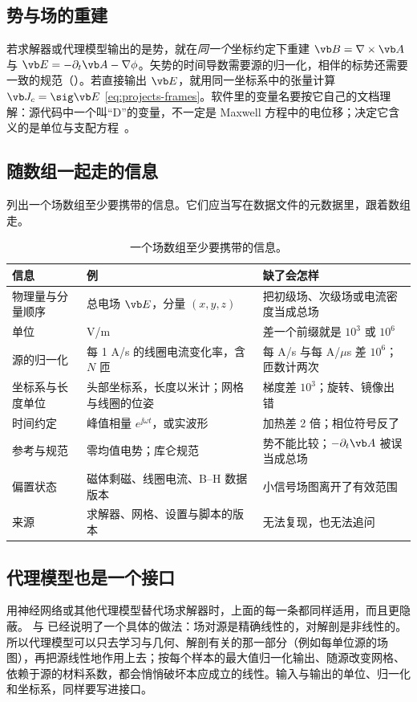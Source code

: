 \subsection{势与场的重建}
若求解器或代理模型输出的是势，就在\emph{同一个}坐标约定下重建 $\vb B=\nabla\times\vb A$ 与 $\vb E=-\partial_t\vb A-\nabla\phi$。矢势的时间导数需要源的归一化，相伴的标势还需要一致的规范（）。若直接输出 $\vb E$，就用同一坐标系中的张量计算 $\vb J_c=\sig\vb E$ \eqref{eq:projects-frames}。软件里的变量名要按它自己的文档理解：源代码中一个叫“D”的变量，不一定是 Maxwell 方程中的电位移；决定它含义的是单位与支配方程~\cite{simnibsfields}。

\subsection{随数组一起走的信息}
 列出一个场数组至少要携带的信息。它们应当写在数据文件的元数据里，跟着数组走。

\begin{table}[htbp]\centering\small
\caption{一个场数组至少要携带的信息。}\label{tab:projects-metadata}
\begin{tabularx}{\linewidth}{@{}>{\raggedright\arraybackslash}p{.2\linewidth} Y Y@{}}
\toprule
信息 & 例 & 缺了会怎样\\\midrule
物理量与分量顺序 & 总电场 $\vb E$，分量 $(x,y,z)$ & 把初级场、次级场或电流密度当成总场\\
单位 & V/m & 差一个前缀就是 $10^3$ 或 $10^6$\\
源的归一化 & 每 1 A/s 的线圈电流变化率，含 $N$ 匝 & 每 A/s 与每 A/$\mu$s 差 $10^6$；匝数计两次\\
坐标系与长度单位 & 头部坐标系，长度以米计；网格与线圈的位姿 & 梯度差 $10^3$；旋转、镜像出错\\
时间约定 & 峰值相量 $e^{\jj\omega t}$，或实波形 & 加热差 2 倍；相位符号反了\\
参考与规范 & 零均值电势；库仑规范 & 势不能比较；$-\partial_t\vb A$ 被误当成总场\\
偏置状态 & 磁体剩磁、线圈电流、B--H 数据版本 & 小信号场图离开了有效范围\\
来源 & 求解器、网格、设置与脚本的版本 & 无法复现，也无法追问\\
\bottomrule
\end{tabularx}
\end{table}

\subsection{代理模型也是一个接口}
用神经网络或其他代理模型替代场求解器时，上面的每一条都同样适用，而且更隐蔽。 与 已经说明了一个具体的做法：场对源是精确线性的，对解剖是非线性的。所以代理模型可以只去学习与几何、解剖有关的那一部分（例如每单位源的场图），再把源线性地作用上去；按每个样本的最大值归一化输出、随源改变网格、依赖于源的材料系数，都会悄悄破坏本应成立的线性。输入与输出的单位、归一化和坐标系，同样要写进接口。

